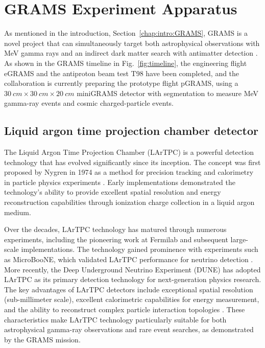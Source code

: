 \chapter{GRAMS Experiment Apparatus}
\label{chap:GRAMS}

As mentioned in the introduction, Section~\ref{chap:intro:GRAMS}, GRAMS is a novel project that can simultaneously target both astrophysical observations with MeV gamma rays and an indirect dark matter search with antimatter detection \cite{aramaki2020dual}. As shown in the GRAMS timeline in Fig.~\ref{fig:timeline}, the engineering flight eGRAMS and the antiproton beam test T98 have been completed, and the collaboration is currently preparing the prototype flight pGRAMS, using a $30~cm \times 30~cm \times 20~cm$ miniGRAMS detector with segmentation to measure MeV gamma-ray events and cosmic charged-particle events.


\section{Liquid argon time projection chamber detector}
\label{chap:GRAMS:detectors}
The Liquid Argon Time Projection Chamber (LArTPC) is a powerful detection technology that has evolved significantly since its inception. The concept was first proposed by Nygren in 1974 as a method for precision tracking and calorimetry in particle physics experiments \cite{NYGREN201822}. Early implementations demonstrated the technology's ability to provide excellent spatial resolution and energy reconstruction capabilities through ionization charge collection in a liquid argon medium.

Over the decades, LArTPC technology has matured through numerous experiments, including the pioneering work at Fermilab and subsequent large-scale implementations. The technology gained prominence with experiments such as MicroBooNE, which validated LArTPC performance for neutrino detection \cite{MicroBooNE:2007ivj}. More recently, the Deep Underground Neutrino Experiment (DUNE) has adopted LArTPC as its primary detection technology for next-generation physics research. The key advantages of LArTPC detectors include exceptional spatial resolution (sub-millimeter scale), excellent calorimetric capabilities for energy measurement, and the ability to reconstruct complex particle interaction topologies \cite{FALCONE2022167217}. These characteristics make LArTPC technology particularly suitable for both astrophysical gamma-ray observations and rare event searches, as demonstrated by the GRAMS mission.

